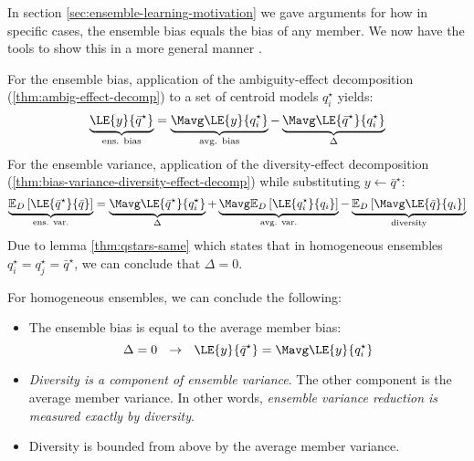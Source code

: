 \documentclass[../main.tex]{subfiles}
\begin{document}
In section \ref{sec:ensemble-learning-motivation} we gave arguments for how in specific cases, the ensemble bias equals the bias of any member. We now have the tools to show this in a more general manner \cite{wood_UnifiedTheoryDiversity_2023}.

For the ensemble bias, application of the ambiguity-effect decomposition (\ref{thm:ambig-effect-decomp}) to a set of centroid models $q_{i}^\star$ yields:
$$
\underbrace{
\LE{y}{\bar{q}^\star} 
}_{\text{ens. bias}}
= 
\underbrace{
\Mavg \LE{y}{q_{i}^\star}
}_{\text{avg. bias}}
- 
\underbrace{
\Mavg\LE{\bar{q}^\star}{q_{i}^\star}
}_{\Delta}
$$
For the ensemble variance, application of the diversity-effect decomposition (\ref{thm:bias-variance-diversity-effect-decomp}) while substituting $y \gets \bar{q}^\star$:
$$
\underbrace{
\mathbb{E}_{D}\left[ \LE{\bar{q}^\star}{\bar{q}} \right]
}_{\text{ens. var.}}
 = 
\underbrace{
\Mavg \LE{\bar{q}^\star}{q_{i}^\star} 
}_{\Delta}
+ 
\underbrace{
\Mavg \mathbb{E}_{D}\left[ \LE{q_{i}^\star}{q_{i}} \right] 
}_{\text{avg. var.}}
- 
\underbrace{
\mathbb{E}_{D}\left[ \Mavg \LE{\bar{q}}{q_{i}} \right] 
}_{\text{diversity}}
$$
Due to lemma \ref{thm:qstars-same} which states that in homogeneous ensembles $q_{i}^\star = q_{j}^\star = \bar{q}^\star$, we can conclude that $\Delta = 0$. 
\begin{corollary} For homogeneous ensembles, we can conclude the following:
\begin{itemize}
    \item The ensemble bias is equal to the average member bias:
$$
\Delta = 0 ~ ~ \rightarrow ~ ~ \LE{y}{\bar{q}^\star} = \Mavg \LE{y}{q_{i}^\star}
$$
\item \textit{Diversity is a component of ensemble variance}. The other component is the average member variance. In other words, \textit{ensemble variance reduction is measured exactly by diversity}. 
\item Diversity is bounded from above by the average member variance.
\end{itemize}
\end{corollary}





\end{document}
